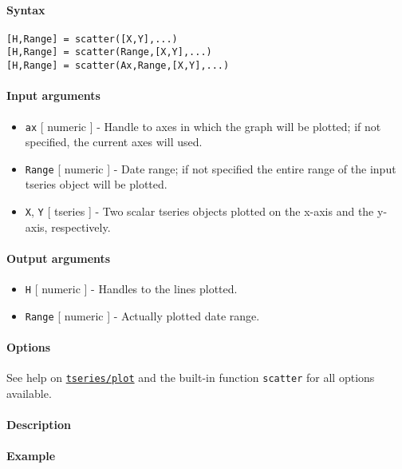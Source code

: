


	\paragraph{Syntax}\label{syntax}

\begin{verbatim}
[H,Range] = scatter([X,Y],...)
[H,Range] = scatter(Range,[X,Y],...)
[H,Range] = scatter(Ax,Range,[X,Y],...)
\end{verbatim}

\paragraph{Input arguments}\label{input-arguments}

\begin{itemize}
\item
  \texttt{ax} {[} numeric {]} - Handle to axes in which the graph will
  be plotted; if not specified, the current axes will used.
\item
  \texttt{Range} {[} numeric {]} - Date range; if not specified the
  entire range of the input tseries object will be plotted.
\item
  \texttt{X}, \texttt{Y} {[} tseries {]} - Two scalar tseries objects
  plotted on the x-axis and the y-axis, respectively.
\end{itemize}

\paragraph{Output arguments}\label{output-arguments}

\begin{itemize}
\item
  \texttt{H} {[} numeric {]} - Handles to the lines plotted.
\item
  \texttt{Range} {[} numeric {]} - Actually plotted date range.
\end{itemize}

\paragraph{Options}\label{options}

See help on \href{tseries/plot}{\texttt{tseries/plot}} and the built-in
function \texttt{scatter} for all options available.

\paragraph{Description}\label{description}

\paragraph{Example}\label{example}


